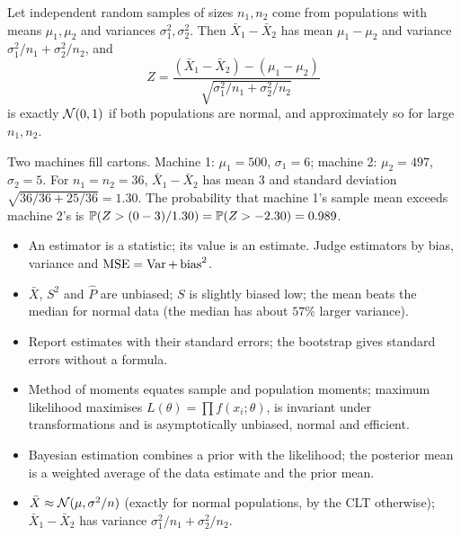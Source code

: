 \begin{theorem}\label{thm:diffmeans}
Let independent random samples of sizes $n_1,n_2$ come from populations with means $\mu_1,\mu_2$ and variances $\sigma_1^2,\sigma_2^2$. Then $\bar{X}_1-\bar{X}_2$ has mean $\mu_1-\mu_2$ and variance $\sigma_1^2/n_1+\sigma_2^2/n_2$, and
\[ Z=\frac{(\bar{X}_1-\bar{X}_2)-(\mu_1-\mu_2)}{\sqrt{\sigma_1^2/n_1+\sigma_2^2/n_2}} \]
is exactly $\mathcal{N}(0,1)$ if both populations are normal, and approximately so for large $n_1,n_2$.
\end{theorem}

\begin{example}
Two machines fill cartons. Machine 1: $\mu_1=500$, $\sigma_1=6$; machine 2: $\mu_2=497$, $\sigma_2=5$. For $n_1=n_2=36$, $\bar{X}_1-\bar{X}_2$ has mean $3$ and standard deviation $\sqrt{36/36+25/36}=1.30$. The probability that machine 1's sample mean exceeds machine 2's is $\mathbb{P}(Z>(0-3)/1.30)=\mathbb{P}(Z>-2.30)=0.989$.
\end{example}

\begin{summarybox}
\begin{itemize}
  \item An estimator is a statistic; its value is an estimate. Judge estimators by bias, variance and $\operatorname{MSE}=\operatorname{Var}+\operatorname{bias}^2$.
  \item $\bar{X}$, $S^2$ and $\hat{P}$ are unbiased; $S$ is slightly biased low; the mean beats the median for normal data (the median has about $57\%$ larger variance).
  \item Report estimates with their standard errors; the bootstrap gives standard errors without a formula.
  \item Method of moments equates sample and population moments; maximum likelihood maximises $L(\theta)=\prod f(x_i;\theta)$, is invariant under transformations and is asymptotically unbiased, normal and efficient.
  \item Bayesian estimation combines a prior with the likelihood; the posterior mean is a weighted average of the data estimate and the prior mean.
  \item $\bar{X}\approx\mathcal{N}(\mu,\sigma^2/n)$ (exactly for normal populations, by the CLT otherwise); $\bar{X}_1-\bar{X}_2$ has variance $\sigma_1^2/n_1+\sigma_2^2/n_2$.
\end{itemize}
\end{summarybox}

